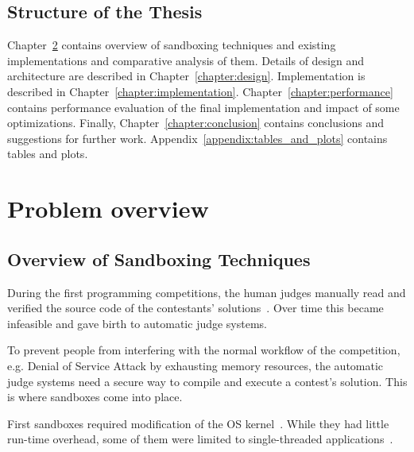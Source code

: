 \documentclass[en]{pracamgr}
\begin{document}


\section{Structure of the Thesis}

Chapter~\ref{chapter:problem_overview} contains overview of sandboxing techniques and existing implementations and comparative analysis of them. Details of design and architecture are described in Chapter~\ref{chapter:design}. Implementation is described in Chapter~\ref{chapter:implementation}. Chapter~\ref{chapter:performance} contains performance evaluation of the final implementation and impact of some optimizations. Finally, Chapter~\ref{chapter:conclusion} contains conclusions and suggestions for further work. Appendix~\ref{appendix:tables_and_plots} contains tables and plots.

\chapter{Problem overview}\label{chapter:problem_overview}

\section{Overview of Sandboxing Techniques}

During the first programming competitions, the human judges manually read and verified the source code of the contestants' solutions~\cite{tochev2010validating}. Over time this became infeasible and gave birth to automatic judge systems.

To prevent people from interfering with the normal workflow of the competition, e.g. Denial of Service Attack by exhausting memory resources, the automatic judge systems need a secure way to compile and execute a contest's solution. This is where sandboxes come into place.

First sandboxes required modification of the OS kernel~\cite{provos2003improving, garfinkel2004janus, garfinkel2004ostia, jana2011txbox, li2014minibox}. While they had little run-time overhead, some of them were limited to single-threaded applications~\cite{merry2009using}.
\end{document}
